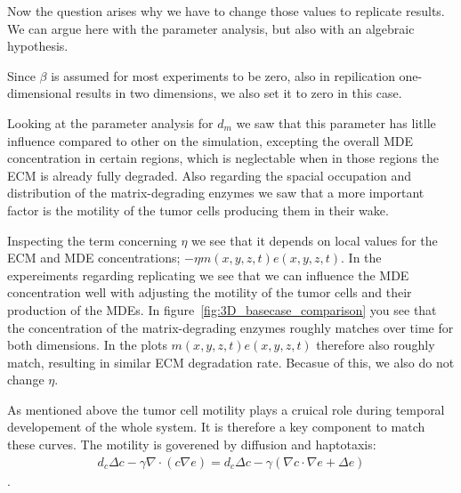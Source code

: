 Now the question arises why we have to change those values to replicate results. We can argue here with the parameter analysis, but also with an algebraic hypothesis. 

Since $\beta$ is assumed for most experiments to be zero, also in repilication one-dimensional results in two dimensions, we also set it to zero in this case. 

Looking at the parameter analysis for $d_m$ we saw that this parameter has litlle influence compared to other on the simulation, excepting the overall MDE concentration in certain regions, which is neglectable when in those regions the ECM is already fully degraded. Also regarding the spacial occupation and distribution of the matrix-degrading enzymes we saw that a more important factor is the motility of the tumor cells producing them in their wake. 

Inspecting the term concerning $\eta$ we see that it depends on local values for the ECM and MDE concentrations; $-\eta m(x,y,z,t)e(x,y,z,t)$. In the expereiments regarding replicating we see that we can influence the MDE concentration well with adjusting the motility of the tumor cells and their production of the MDEs. In figure~\ref{fig:3D_basecase_comparison} you see that the concentration of the matrix-degrading enzymes roughly matches over time for both dimensions. In the plots $m(x,y,z,t)e(x,y,z,t)$ therefore also roughly match, resulting in similar ECM degradation rate. Becasue of this, we also do not change $\eta$.

As mentioned above the tumor cell motility plays a cruical role during temporal developement of the whole system. It is therefore a key component to match these curves. The motility is goverened by diffusion and haptotaxis: 
\begin{align*}
    d_c\Delta c - \gamma \nabla\cdot (c\nabla e)=d_c\Delta c - \gamma (\nabla c \cdot \nabla e + \Delta e)
\end{align*}.

